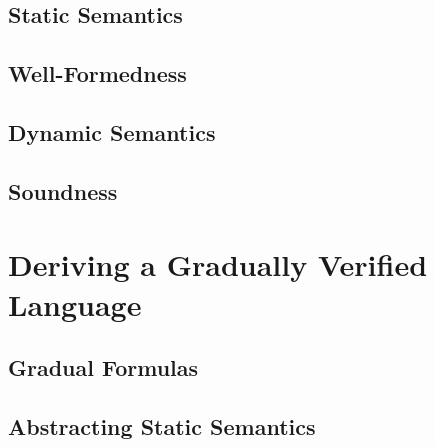 
\subsection{Static Semantics}%
\label{sec:static-semantics}


\subsection{Well-Formedness}
\label{sec:well-formedness}


\subsection{Dynamic Semantics}
\label{ssec:dynamic-semantics}


\subsection{Soundness}


\section{Deriving a Gradually Verified Language}

\subsection{Gradual Formulas}

\subsection{Abstracting Static Semantics}

